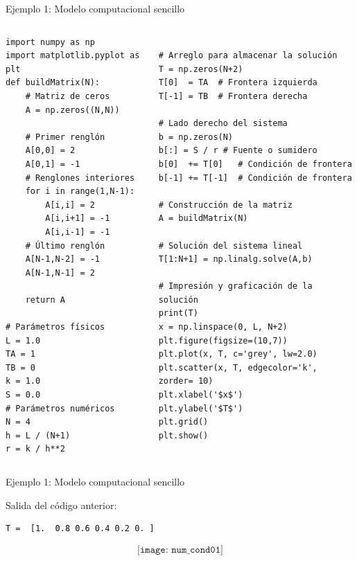 \documentclass{beamer}
\begin{document}
\begin{frame}[fragile]{Ejemplo 1: Modelo computacional sencillo}

\begin{block}{}

\begin{columns}[t]
\begin{column}{0.48\textwidth}
\begin{lstlisting}
import numpy as np
import matplotlib.pyplot as plt
def buildMatrix(N):
    # Matriz de ceros
    A = np.zeros((N,N))
	
    # Primer renglón
    A[0,0] = 2
    A[0,1] = -1
    # Renglones interiores
    for i in range(1,N-1):
        A[i,i] = 2
        A[i,i+1] = -1
        A[i,i-1] = -1
    # Último renglón
    A[N-1,N-2] = -1
    A[N-1,N-1] = 2
	
    return A

# Parámetros físicos
L = 1.0
TA = 1
TB = 0
k = 1.0
S = 0.0
# Parámetros numéricos
N = 4
h = L / (N+1)
r = k / h**2
\end{lstlisting}		
\end{column}
\begin{column}{0.48\textwidth}
\begin{lstlisting}

# Arreglo para almacenar la solución
T = np.zeros(N+2)
T[0]  = TA  # Frontera izquierda
T[-1] = TB  # Frontera derecha

# Lado derecho del sistema
b = np.zeros(N)
b[:] = S / r # Fuente o sumidero
b[0]  += T[0]   # Condición de frontera
b[-1] += T[-1]  # Condición de frontera

# Construcción de la matriz
A = buildMatrix(N)

# Solución del sistema lineal
T[1:N+1] = np.linalg.solve(A,b)

# Impresión y graficación de la solución
print(T)
x = np.linspace(0, L, N+2)
plt.figure(figsize=(10,7))
plt.plot(x, T, c='grey', lw=2.0)
plt.scatter(x, T, edgecolor='k', zorder= 10)
plt.xlabel('$x$')
plt.ylabel('$T$')
plt.grid()
plt.show()
\end{lstlisting}		
\end{column}
\end{columns}
\end{block}

\end{frame}

\begin{frame}[fragile]{Ejemplo 1: Modelo computacional sencillo}

\begin{block}{Salida del código anterior:}
\begin{verbatim}
T =  [1.  0.8 0.6 0.4 0.2 0. ]
\end{verbatim}
$$ \texttt{[image: num\_cond01]}$$
\end{block}
\end{frame}
\end{document}
